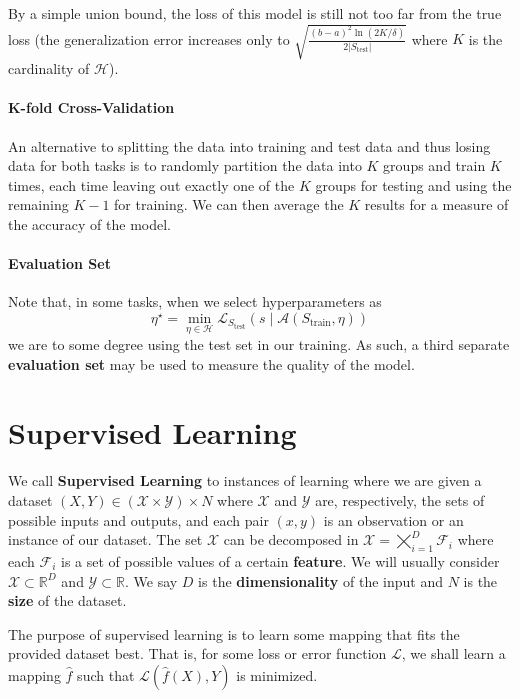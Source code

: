 \documentclass{article}
\newcommand{\R}{\mathbb{R}}
\newcommand{\loss}{\mathcal{L}}
\begin{document}
By a simple union bound, the loss of this model is still not too far from the true loss (the generalization error increases only to $\sqrt{\frac{(b-a)^2 \ln(2K/\delta)}{2|S_{\text{test}}|}}$ where $K$ is the cardinality of $\mathcal{H}$).

\paragraph{K-fold Cross-Validation}

An alternative to splitting the data into training and test data and thus losing data for both tasks is to randomly partition the data into $K$ groups and train $K$ times, each time leaving out exactly one of the $K$ groups for testing and using the remaining $K-1$ for training.
We can then average the $K$ results for a measure of the accuracy of the model.

\paragraph{Evaluation Set}

Note that, in some tasks, when we select hyperparameters as
$$
\eta^\star = \min_{\eta \in \mathcal{H}} \loss_{S_{\text{test}}} (s \mid \mathcal{A}(S_{\text{train}}, \eta))
$$
we are to some degree using the test set in our training.
As such, a third separate \textbf{evaluation set} may be used to measure the quality of the model.

\section{Supervised Learning}

We call \textbf{Supervised Learning} to instances of learning where we are given a dataset $(X, Y) \in (\mathcal{X} \times \mathcal{Y}) \times N$ where $\mathcal{X}$ and $\mathcal{Y}$ are, respectively, the sets of possible inputs and outputs, and each pair $(x, y)$ is an observation or an instance of our dataset. 
The set $\mathcal{X}$ can be decomposed in $\mathcal{X} = \bigtimes_{i=1}^D \mathcal{F}_i$ where each $\mathcal{F}_i$ is a set of possible values of a certain \textbf{feature}.
We will usually consider $\mathcal{X} \subset \R^D$ and $\mathcal{Y} \subset \R$.
We say $D$ is the \textbf{dimensionality} of the input and $N$ is the \textbf{size} of the dataset.

The purpose of supervised learning is to learn some mapping that fits the provided dataset best. 
That is, for some loss or error function $\loss$, we shall learn a mapping $\hat{f}$ such that $\loss(\hat{f}(X), Y)$ is minimized.
\end{document}
